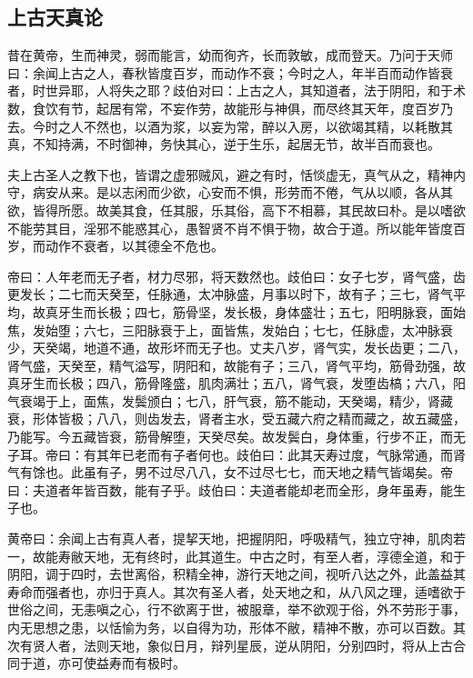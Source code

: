 \subsection{上古天真论}

昔在黄帝，生而神灵，弱而能言，幼而徇齐，长而敦敏，成而登天。乃问于天师曰：余闻上古之人，春秋皆度百岁，而动作不衰；今时之人，年半百而动作皆衰者，时世异耶，人将失之耶？歧伯对曰：上古之人，其知道者，法于阴阳，和于术数，食饮有节，起居有常，不妄作劳，故能形与神俱，而尽终其天年，度百岁乃去。今时之人不然也，以酒为浆，以妄为常，醉以入房，以欲竭其精，以耗散其真，不知持满，不时御神，务快其心，逆于生乐，起居无节，故半百而衰也。

夫上古圣人之教下也，皆谓之虚邪贼风，避之有时，恬惔虚无，真气从之，精神内守，病安从来。是以志闲而少欲，心安而不惧，形劳而不倦，气从以顺，各从其欲，皆得所愿。故美其食，任其服，乐其俗，高下不相慕，其民故曰朴。是以嗜欲不能劳其目，淫邪不能惑其心，愚智贤不肖不惧于物，故合于道。所以能年皆度百岁，而动作不衰者，以其德全不危也。

帝曰：人年老而无子者，材力尽邪，将天数然也。歧伯曰：女子七岁，肾气盛，齿更发长；二七而天癸至，任脉通，太冲脉盛，月事以时下，故有子；三七，肾气平均，故真牙生而长极；四七，筋骨坚，发长极，身体盛壮；五七，阳明脉衰，面始焦，发始堕；六七，三阳脉衰于上，面皆焦，发始白；七七，任脉虚，太冲脉衰少，天癸竭，地道不通，故形坏而无子也。丈夫八岁，肾气实，发长齿更；二八，肾气盛，天癸至，精气溢写，阴阳和，故能有子；三八，肾气平均，筋骨劲强，故真牙生而长极；四八，筋骨隆盛，肌肉满壮；五八，肾气衰，发堕齿槁；六八，阳气衰竭于上，面焦，发鬓颁白；七八，肝气衰，筋不能动，天癸竭，精少，肾藏衰，形体皆极；八八，则齿发去，肾者主水，受五藏六府之精而藏之，故五藏盛，乃能写。今五藏皆衰，筋骨解堕，天癸尽矣。故发鬓白，身体重，行步不正，而无子耳。帝曰：有其年已老而有子者何也。歧伯曰：此其天寿过度，气脉常通，而肾气有馀也。此虽有子，男不过尽八八，女不过尽七七，而天地之精气皆竭矣。帝曰：夫道者年皆百数，能有子乎。歧伯曰：夫道者能却老而全形，身年虽寿，能生子也。

黄帝曰：余闻上古有真人者，提挈天地，把握阴阳，呼吸精气，独立守神，肌肉若一，故能寿敝天地，无有终时，此其道生。中古之时，有至人者，淳德全道，和于阴阳，调于四时，去世离俗，积精全神，游行天地之间，视听八达之外，此盖益其寿命而强者也，亦归于真人。其次有圣人者，处天地之和，从八风之理，适嗜欲于世俗之间，无恚嗔之心，行不欲离于世，被服章，举不欲观于俗，外不劳形于事，内无思想之患，以恬愉为务，以自得为功，形体不敝，精神不散，亦可以百数。其次有贤人者，法则天地，象似日月，辩列星辰，逆从阴阳，分别四时，将从上古合同于道，亦可使益寿而有极时。
